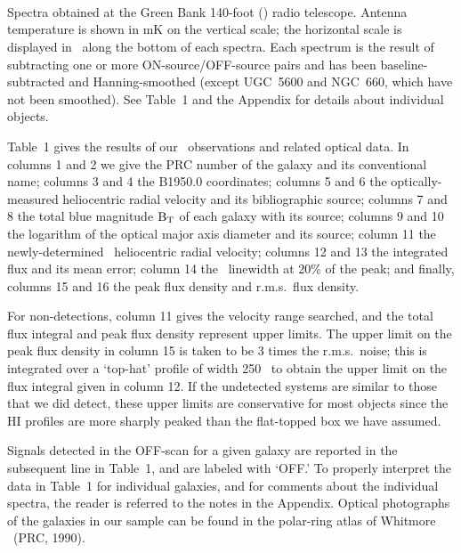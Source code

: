 ~

\vfil\eject

~

\vfil\eject

~
\vspace{2.6in}

\medskip
\centerline{}

\medskip
{\tenpt 
   
Spectra obtained at the Green Bank 140-foot () 
radio telescope.  
Antenna temperature is shown in mK on the vertical scale; the horizontal 
scale is displayed in \KMS\ along the bottom of each spectra.  
Each spectrum is the result of subtracting 
one or more ON-source/OFF-source pairs and has been baseline-subtracted and 
Hanning-smoothed (except UGC~5600 and NGC~660, which have not been smoothed).
See Table~1 and the Appendix for details about individual objects.
}

\vfil\eject

Table~1 gives the results of our \HI\ observations and related optical data.
In columns 1 and 2 we give the PRC number of the galaxy 
and its conventional name; 
columns 3 and 4 the B1950.0 coordinates; 
columns 5 and 6 the optically-measured heliocentric radial 
velocity and its bibliographic source; 
columns 7 and 8 the total blue magnitude ${\rm B_T}$ 
of each galaxy with its source; columns 9 and 10 the logarithm 
of the optical major axis diameter and its source; column 11 
the newly-determined \HI\ heliocentric radial velocity;
columns 12 and 13 the integrated flux and its mean error; 
column 14 the \HI\ linewidth at 
20\% of the peak; and finally, columns 15 and 16 the peak flux density 
and r.m.s.\ flux density.

For non-detections, column 11 gives the velocity range searched, and the 
total flux integral and peak flux density represent upper limits.  
The upper limit on the peak flux density in column 15 is taken to 
be 3 times the r.m.s.\ noise; this is integrated over a `top-hat' profile 
of width 250 \KMS\ to obtain the upper limit on the 
flux integral given in column 12.  
If the undetected systems are similar to those that we did detect,  
these upper limits are conservative for most objects since 
the HI profiles are more sharply peaked than the flat-topped box we have 
assumed.

Signals detected in the OFF-scan for a given galaxy are reported in 
the subsequent line in Table~1, and are labeled with `OFF.' 
To properly interpret the data in Table~1 for individual
galaxies, and for comments about the individual spectra, the reader is
referred to the notes in the Appendix.  
Optical photographs of the galaxies in our sample can be found in
the polar-ring atlas of Whitmore \etal\ (PRC, 1990).

